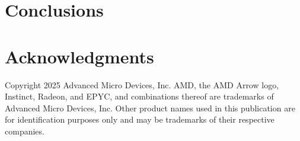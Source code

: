 \documentclass[acmtog,natbib=false]{acmart}
\begin{document}
\section{Conclusions}
\label{sec:Conclusions}




\section*{Acknowledgments}
Copyright 2025 Advanced Micro Devices, Inc.
AMD, the AMD Arrow logo, Instinct, Radeon, and EPYC, and combinations thereof are trademarks of Advanced Micro Devices, Inc.
Other product names used in this publication are for identification purposes only and may be trademarks of their respective companies.

\printbibliography
\end{document}
